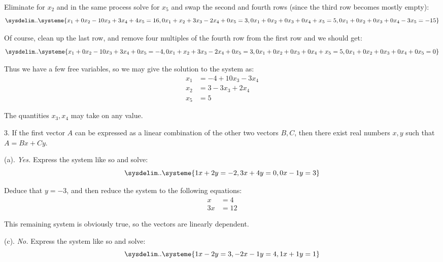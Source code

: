 \documentclass[11pt]{article}
\begin{document}
Eliminate for $x_2$ and in the same process solve for $x_5$ and swap the second and fourth rows (since the third row becomes mostly empty):
\begin{equation*}
    \sysdelim..\systeme{
    x_1 + 0x_2  -10x_3  +3x_4  +4x_5 = 16,
    0x_1  +x_2  +3x_3  -2x_4  +0x_5 = 3,
    0x_1  +0x_2  +0x_3  +0x_4  +x_5 = 5,
    0x_1  +0x_2  +0x_3  +0x_4  -3x_5 = -15
    }
\end{equation*}

Of course, clean up the last row, and remove four multiples of the fourth row from the first row and we should get:
\begin{equation*}
    \sysdelim..\systeme{
    x_1 + 0x_2  -10x_3  +3x_4  +0x_5 = -4,
    0x_1  +x_2  +3x_3  -2x_4  +0x_5 = 3,
    0x_1  +0x_2  +0x_3  +0x_4  +x_5 = 5,
    0x_1  +0x_2  +0x_3  +0x_4  +0x_5 = 0
    }
\end{equation*}

Thus we have a few free variables, so we may give the solution to the system as:
\begin{align*}
    x_1 &= -4+10x_3-3x_4 \\
    x_2 &= 3-3x_3+2x_4 \\
    x_5 &= 5
\end{align*}

The quantities $x_3,x_4$ may take on any value.

3. If the first vector $A$ can be expressed as a linear combination of the other two vectors $B,C$, then there exist real numbers $x,y$ such that $A = Bx+Cy$.

(a). \textit{Yes.} Express the system like so and solve:
\begin{equation*}
    \sysdelim..\systeme{
        1x + 2y = -2,
        3x + 4y = 0,
        0x - 1y = 3
    }
\end{equation*}

Deduce that $y=-3$, and then reduce the system to the following equations:
\begin{align*}
    x &= 4 \\
    3x &= 12
\end{align*}

This remaining system is obviously true, so the vectors are linearly dependent.

(c). \textit{No.} Express the system like so and solve:
\begin{equation*}
    \sysdelim..\systeme{
        1x -2y = 3,
        -2x -1y = 4,
        1x +1y = 1
    }
\end{equation*}
\end{document}
